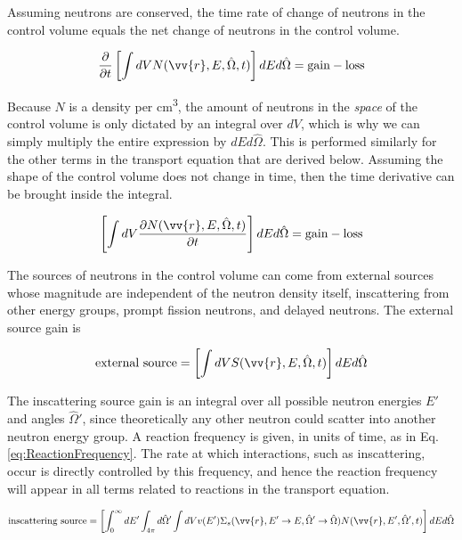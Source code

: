 \documentclass[10pt]{article}
\newcommand{\hO}{\hat{\Omega}}
\begin{document}
\begin{flushleft}
Assuming neutrons are conserved, the time rate of change of neutrons in the control volume equals the net change of neutrons in the control volume. 

\begin{equation}
\label{eq:Conservation1}
\frac{\partial}{\partial t} \left\lbrack\int dV N(\vv{r}, E, \hO  ,t)\right\rbrack dEd\hO   = \textrm{gain} - \textrm{loss}
\end{equation}

Because \(N\) is a density per cm\textsuperscript{3}, the amount of neutrons in the \textit{space} of the control volume is only dictated by an integral over \(dV\), which is why we can simply multiply the entire expression by \(dEd\hO  \). This is performed similarly for the other terms in the transport equation that are derived below. Assuming the shape of the control volume does not change in time, then the time derivative can be brought inside the integral.

\begin{equation}
\label{eq:Conservation2}
\left\lbrack\int dV \frac{\partial N(\vv{r}, E, \hO  ,t) }{\partial t}\right\rbrack dEd\hO   = \textrm{gain} - \textrm{loss}
\end{equation}

The sources of neutrons in the control volume can come from external sources whose magnitude are independent of the neutron density itself, inscattering from other energy groups, prompt fission neutrons, and delayed neutrons. The external source gain is

\begin{equation}
\label{eq:ConservationExternalSource}
\textrm{external source} = \left\lbrack\int dV S(\vv{r}, E, \hO  ,t)\right\rbrack dEd\hO  
\end{equation}

The inscattering source gain is an integral over all possible neutron energies \(E'\) and angles \(\hO  '\), since theoretically any other neutron could scatter into another neutron energy group. A reaction frequency is given, in units of time, as in Eq. \ref{eq:ReactionFrequency}. The rate at which interactions, such as inscattering, occur is directly controlled by this frequency, and hence the reaction frequency will appear in all terms related to reactions in the transport equation.

\begin{equation}
\label{eq:ConservationInscatteringSource}
\textrm{inscattering source} = \left\lbrack\int_{0}^{\infty} dE'\int_{4\pi}^{} d\hO  '\int dV v(E')\Sigma_s(\vv{r},E'\rightarrow E, \hO  '\rightarrow\hO  ) N(\vv{r}, E', \hO  ',t)\right\rbrack dEd\hO  
\end{equation}


\end{flushleft}
\end{document}
